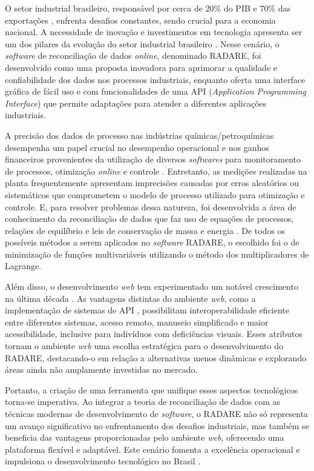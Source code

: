 \label{Cap:Introducao}

O setor industrial brasileiro, responsável por cerca de 20\% do PIB e 70\% das exportações \cite{cni2024}, enfrenta desafios constantes, sendo crucial para a economia nacional. A necessidade de inovação e investimentos em tecnologia apresenta ser um dos pilares da evolução do setor industrial brasileiro \cite{produtividadeindustria}. Nesse cenário, o \textit{software} de reconciliação de dados \textit{online}, denominado RADARE, foi desenvolvido como uma proposta inovadora para aprimorar a qualidade e confiabilidade dos dados nos processos industriais, enquanto oferta uma interface gráfica de fácil uso e com funcionalidades de uma API (\textit{Application Programming Interface}) que permite adaptações para atender a diferentes aplicações industriais.

A precisão dos dados de processo nas indústrias químicas/petroquímicas desempenha um papel crucial no desempenho operacional e nos ganhos financeiros provenientes da utilização de diversos \textit{softwares} para monitoramento de processos, otimização \textit{online} e controle \cite{datarecshakar}. Entretanto, as medições realizadas na planta frequentemente apresentam imprecisões causadas por erros aleatórios ou sistemáticos que comprometem o modelo de processo utilizado para otimização e controle. E, para resolver problemas dessa natureza, foi desenvolvida a área de conhecimento da reconciliação de dados que faz uso de equações de processos, relações de equilíbrio e leis de conservação de massa e energia \cite{reformulationdatarecon}. De todos os possíveis métodos a serem aplicados no \textit{software} RADARE, o escolhido foi o de minimização de funções multivariáveis utilizando o método dos multiplicadores de Lagrange.

Além disso, o desenvolvimento \textit{web} tem experimentado um notável crescimento na última década \cite{webusage}. As vantagens distintas do ambiente \textit{web}, como a implementação de sistemas de API \cite{apirest}, possibilitam interoperabilidade eficiente entre diferentes sistemas, acesso remoto, manuseio simplificado \cite{apiimportance} e maior acessibilidade, inclusive para indivíduos com deficiências visuais. Esses atributos tornam o ambiente \textit{web} uma escolha estratégica para o desenvolvimento do RADARE, destacando-o em relação a alternativas menos dinâmicas e explorando áreas ainda não amplamente investidas no mercado.

Portanto, a criação de uma ferramenta que unifique esses aspectos tecnológicos torna-se imperativa. Ao integrar a teoria de reconciliação de dados com as técnicas modernas de desenvolvimento de \textit{software}, o RADARE não só representa um avanço significativo no enfrentamento dos desafios industriais, mas também se beneficia das vantagens proporcionadas pelo ambiente \textit{web}, oferecendo uma plataforma flexível e adaptável. Este cenário fomenta a excelência operacional e impulsiona o desenvolvimento tecnológico no Brasil \cite{industry4status}.

